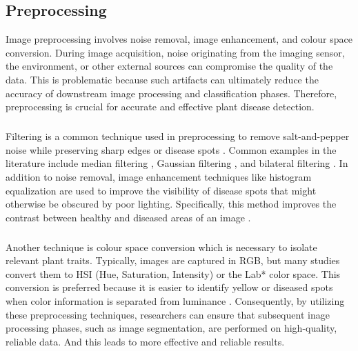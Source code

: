 \subsection{Preprocessing}
Image preprocessing involves noise removal, image enhancement, and colour space conversion. During image acquisition, noise originating from the imaging sensor, the environment, or other external sources can compromise the quality of the data. This is problematic because such artifacts can ultimately reduce the accuracy of downstream image processing and classification phases. Therefore, preprocessing is crucial for accurate and effective plant disease detection.

\subparagraph{} 
Filtering is a common technique used in preprocessing to remove salt-and-pepper noise while preserving sharp edges or disease spots \cite{gonzalezDigitalImageProcessing2017, saiImageQualityEnhancement2023, thangaduraiComputerVisionimageEnhancement2014}. Common examples in the literature include median filtering \cite{hamudaSurveyImageProcessing2016a, desaiEnhancingImageQuality2025}, Gaussian filtering \cite{mamathaPreprocessingTomatoLeaf2024}, and bilateral filtering \cite{aBenchmarkingImageFiltering2025}. In addition to noise removal, image enhancement techniques like histogram equalization are used to improve the visibility of disease spots that might otherwise be obscured by poor lighting. Specifically, this method improves the contrast between healthy and diseased areas of an image \cite{EnhancingTomatoLeaf, thangaduraiComputerVisionimageEnhancement2014a, patilEnhancedRadialBasis2022}.

\subparagraph{} Another technique is colour space conversion which is necessary to isolate relevant plant traits. Typically, images are captured in RGB, but many studies convert them to HSI (Hue, Saturation, Intensity) or the Lab* color space. This conversion is preferred because it is easier to identify yellow or diseased spots when color information is separated from luminance \cite{luna-benosoDetectionDiseasesTomato2021, heTomatoDiseaseDegree2023, khanIntelligentFastSystem2024, hussainRobustLeafDisease2024, kumbharCropDiseaseDetection, krusePixelClassificationMethods2014}. Consequently, by utilizing these preprocessing techniques, researchers can ensure that subsequent inage processing phases, such as image segmentation, are performed on high-quality, reliable data. And this leads to more effective and reliable results.

